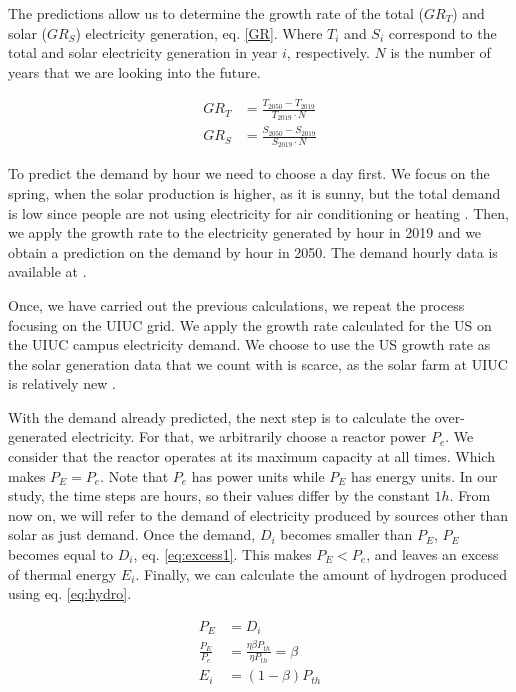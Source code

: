\documentclass{anstrans}
\begin{document}
The predictions allow us to determine the growth rate of the total ($GR_{T}$) and solar ($GR_{S}$) electricity generation, eq. \ref{GR}. Where $T_i$ and $S_i$ correspond to the total and solar electricity generation in year $i$, respectively. $N$ is the number of years that we are looking into the future.

\begin{equation}
\begin{split}
GR_{T} &= \frac{T_{2050}-T_{2019}} {T_{2019} \cdot N }
\\
GR_{S} &= \frac{S_{2050}-S_{2019}} {S_{2019} \cdot N }
\end{split}
\label{GR}
\end{equation}

To predict the demand by hour we need to choose a day first.
We focus on the spring, when the solar production is higher, as it is sunny, but the total demand is low since people are not using electricity for air conditioning or heating \cite{us_department_of_energy_confronting_2017}.
Then, we apply the growth rate to the electricity generated by hour in 2019 and we obtain a prediction on the demand by hour in 2050.
The demand hourly data is available at \cite{eia_united_2020}.

Once, we have carried out the previous calculations, we repeat the process focusing on the \gls{UIUC} grid.
We apply the growth rate calculated for the \gls{US} on the \gls{UIUC} campus electricity demand.
We choose to use the \gls{US} growth rate as the solar generation data that we count with is scarce, as the solar farm at \gls{UIUC} is relatively new \cite{illinois_facilities_and_services_solar_2020}.

With the demand already predicted, the next step is to calculate the over-generated electricity. For that, we arbitrarily choose a reactor power $P_e$.
We consider that the reactor operates at its maximum capacity at all times. Which makes $P_E = P_e$.
Note that $P_e$ has power units while $P_E$ has energy units.
In our study, the time steps are hours, so their values differ by the constant $1h$.
From now on, we will refer to the demand of electricity produced by sources other than solar as just demand.
Once the demand, $D_i$ becomes smaller than $P_E$, $P_E$ becomes equal to $D_i$, eq. \ref{eq:excess1}.
This makes $P_E < P_e$, and leaves an excess of thermal energy $E_i$.
Finally, we can calculate the amount of hydrogen produced using eq. \ref{eq:hydro}.

\begin{equation}
\begin{split}
P_E &= D_i
\\
\frac{P_E}{P_e} &= \frac{\eta \beta P_{th}}{\eta P_{th}} = \beta
\\
E_i &= (1-\beta) P_{th}
\end{split}
\label{eq:excess1}
\end{equation}
\end{document}
